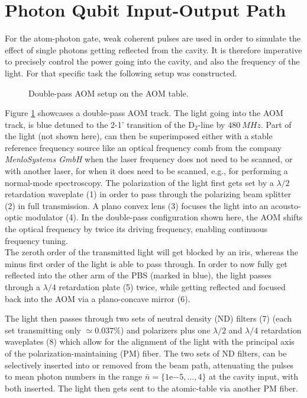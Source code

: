 \section{Photon Qubit Input-Output Path}

For the atom-photon gate, weak coherent pulses are used in order to simulate the effect of single photons getting reflected from the cavity. It is therefore imperative to precisely control the power going into the cavity, and also the frequency of the light. For that specific task the following setup was constructed.

\begin{figure}[htbp]
	\centering
	
	\caption{Double-pass AOM setup on the AOM table.}
	\label{fig:setup_aom_table}
\end{figure}

Figure \ref{fig:setup_aom_table} showcases a double-pass AOM track. The light going into the AOM track, is blue detuned to the 2-1' transition of the $\text{D}_2\text{-line}$ by $\SI{480}{MHz}$. Part of the light (not shown here), can then be superimposed either with a stable reference frequency source like an optical frequency comb from the company \textit{MenloSystems GmbH} when the laser frequency does not need to be scanned, or with another laser, for when it does need to be scanned, e.g., for performing a normal-mode spectroscopy.
The polarization of the light first gets set by a $\lambda/2$ retardation waveplate (1) in order to pass through the polarizing beam splitter (2) in full transmission. A plano convex lens (3) focuses the light into an acousto-optic modulator (4).
In the double-pass configuration shown here, the AOM shifts the optical frequency by twice its driving frequency, enabling continuous frequency tuning.\\

The zeroth order of the transmitted light will get blocked by an iris, whereas the minus first order of the light is able to pass through. In order to now fully get reflected into the other arm of the PBS (marked in blue), the light passes through a $\lambda/4$ retardation plate (5) twice, while getting reflected and focused back into the AOM via a plano-concave mirror (6).

The light then passes through two sets of neutral density (ND) filters (7) (each set transmitting only $\simeq0.037\%$) and polarizers plus one $\lambda/2$ and $\lambda/4$ retardation waveplates (8) which allow for the alignment of the light with the principal axis of the polarization-maintaining (PM) fiber. The two sets of ND filters, can be selectively inserted into or removed from the beam path, attenuating the pulses to mean photon numbers in the range $\bar{n} = \{1\mathrm{e}{-5}, \ldots, 4\}$ at the cavity input, with both inserted. The light then gets sent to the atomic-table via another PM fiber.

